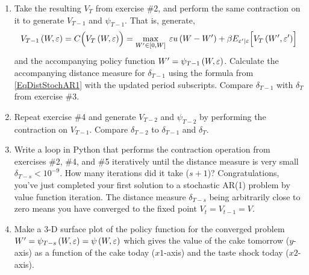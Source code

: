 \begin{enumerate}
   \item Take the resulting $V_T$ from exercise \#2, and perform the same contraction on it to generate $V_{T-1}$ and $\psi_{T-1}$. That is, generate,
   \begin{equation*}
      V_{T-1}\left(W,\varepsilon\right) = C\Bigl(V_T\left(W,\varepsilon\right)\Bigr) = \max_{W'\in[0,W]}\: \varepsilon u\left(W - W'\right) + \beta E_{\varepsilon'|\varepsilon}\Bigl[V_T\left(W',\varepsilon'\right)\Bigr]
   \end{equation*}
   and the accompanying policy function $W'=\psi_{T-1}\left(W,\varepsilon\right)$. Calculate the accompanying distance measure for $\delta_{T-1}$ using the formula from \eqref{EqDistStochAR1} with the updated period subscripts. Compare $\delta_{T-1}$ with $\delta_T$ from exercise \#3.

   \item Repeat exercise \#4 and generate $V_{T-2}$ and $\psi_{T-2}$ by performing the contraction on $V_{T-1}$. Compare $\delta_{T-2}$ to $\delta_{T-1}$ and $\delta_{T}$.

   \item Write a loop in Python that performs the contraction operation from exercises \#2, \#4, and \#5 iteratively until the distance measure is very small $\delta_{T-s} < 10^{-9}$. How many iterations did it take ($s+1$)? Congratulations, you've just completed your first solution to a stochastic AR(1) problem by value function iteration. The distance measure $\delta_{T-s}$ being arbitrarily close to zero means you have converged to the fixed point $V_{t} = V_{t-1} = V$.

   \item Make a 3-D surface plot of the policy function for the converged problem $W' = \psi_{T-s}\left(W,\varepsilon\right) = \psi\left(W,\varepsilon\right)$ which gives the value of the cake tomorrow ($y$-axis) as a function of the cake today ($x1$-axis) and the taste shock today ($x2$-axis).

\end{enumerate}